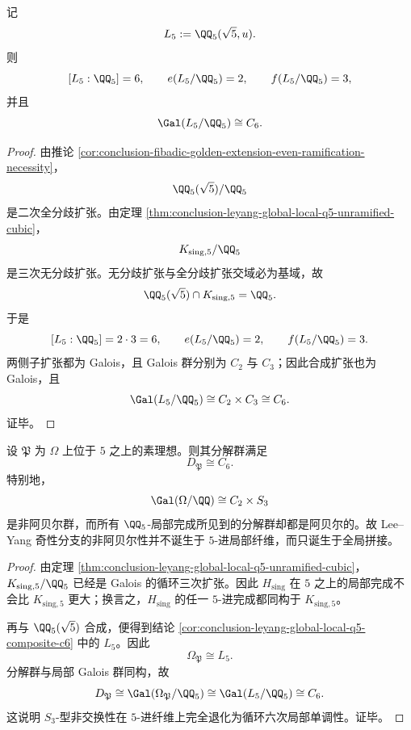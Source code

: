 \begin{corollary}[正则--奇性联合 \texorpdfstring{$5$}{5}-进载体是 \texorpdfstring{$(e,f)=(2,3)$}{(e,f)=(2,3)} 的循环六次扩张]\label{cor:conclusion-leyang-global-local-q5-composite-c6}
记
\[
L_5:=\QQ_5(\sqrt5,u).
\]
则
\[
[L_5:\QQ_5]=6,
\qquad
e(L_5/\QQ_5)=2,
\qquad
f(L_5/\QQ_5)=3,
\]
并且
\[
\Gal(L_5/\QQ_5)\cong C_6.
\]
\end{corollary}
\begin{proof}
由推论 \ref{cor:conclusion-fibadic-golden-extension-even-ramification-necessity}，
\[
\QQ_5(\sqrt5)/\QQ_5
\]
是二次全分歧扩张。由定理 \ref{thm:conclusion-leyang-global-local-q5-unramified-cubic}，
\[
K_{\mathrm{sing},5}/\QQ_5
\]
是三次无分歧扩张。无分歧扩张与全分歧扩张交域必为基域，故
\[
\QQ_5(\sqrt5)\cap K_{\mathrm{sing},5}=\QQ_5.
\]
于是
\[
[L_5:\QQ_5]=2\cdot 3=6,
\qquad
e(L_5/\QQ_5)=2,
\qquad
f(L_5/\QQ_5)=3.
\]
两侧子扩张都为 Galois，且 Galois 群分别为 \(C_2\) 与 \(C_3\)；因此合成扩张也为 Galois，且
\[
\Gal(L_5/\QQ_5)\cong C_2\times C_3\cong C_6.
\]
证毕。
\end{proof}

\begin{theorem}\label{thm:conclusion-leyang-global-local-nonabelianity-disappears-at-q5}
设 \(\mathfrak P\) 为 \(\Omega\) 上位于 \(5\) 之上的素理想。则其分解群满足
\[
D_{\mathfrak P}\cong C_6.
\]
特别地，
\[
\Gal(\Omega/\QQ)\cong C_2\times S_3
\]
是非阿贝尔群，而所有 \(\QQ_5\)-局部完成所见到的分解群却都是阿贝尔的。故 Lee--Yang 奇性分支的非阿贝尔性并不诞生于 \(5\)-进局部纤维，而只诞生于全局拼接。
\end{theorem}
\begin{proof}
由定理 \ref{thm:conclusion-leyang-global-local-q5-unramified-cubic}，\(K_{\mathrm{sing},5}/\QQ_5\) 已经是 Galois 的循环三次扩张。因此 \(H_{\mathrm{sing}}\) 在 \(5\) 之上的局部完成不会比 \(K_{\mathrm{sing},5}\) 更大；换言之，\(H_{\mathrm{sing}}\) 的任一 \(5\)-进完成都同构于 \(K_{\mathrm{sing},5}\)。

再与 \(\QQ_5(\sqrt5)\) 合成，便得到结论 \ref{cor:conclusion-leyang-global-local-q5-composite-c6} 中的 \(L_5\)。因此
\[
\Omega_{\mathfrak P}\cong L_5.
\]
分解群与局部 Galois 群同构，故
\[
D_{\mathfrak P}\cong \Gal(\Omega_{\mathfrak P}/\QQ_5)\cong \Gal(L_5/\QQ_5)\cong C_6.
\]
这说明 \(S_3\)-型非交换性在 \(5\)-进纤维上完全退化为循环六次局部单调性。证毕。
\end{proof}

